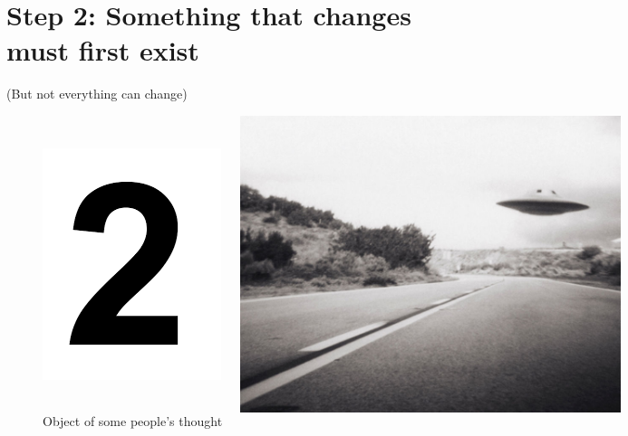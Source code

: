 \documentclass[xcolor=dvipsnames]{beamer}
\begin{document}
\section{Step 2: Something that changes must first exist}


\begin{frame}{(But not everything can change)}
\begin{figure}
  \centering
  \begin{columns}
    \centering
    \caption {Object of thought (abstract)}
    \includegraphics[width=0.99\textwidth]{number}
    \centering
    \caption {Object of some people's thought}
    \includegraphics[width=0.99\textwidth]{ufo}

\end{columns}
\end{figure}
\end{frame}
\end{document}
